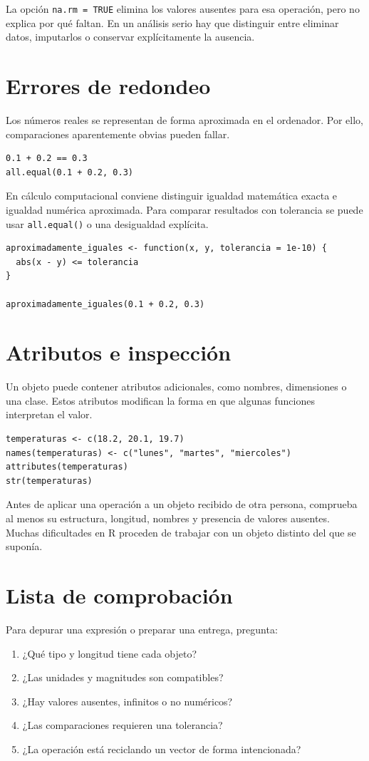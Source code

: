 \documentclass[11pt,a4paper,oneside]{book}
\begin{document}
La opción \texttt{na.rm = TRUE} elimina los valores ausentes para esa operación, pero no explica por qué faltan. En un análisis serio hay que distinguir entre eliminar datos, imputarlos o conservar explícitamente la ausencia.

\section{Errores de redondeo}
Los números reales se representan de forma aproximada en el ordenador. Por ello, comparaciones aparentemente obvias pueden fallar.

\begin{lstlisting}[style=rstyle]
0.1 + 0.2 == 0.3
all.equal(0.1 + 0.2, 0.3)
\end{lstlisting}

En cálculo computacional conviene distinguir igualdad matemática exacta e igualdad numérica aproximada. Para comparar resultados con tolerancia se puede usar \texttt{all.equal()} o una desigualdad explícita.

\begin{lstlisting}[style=rstyle]
aproximadamente_iguales <- function(x, y, tolerancia = 1e-10) {
  abs(x - y) <= tolerancia
}

aproximadamente_iguales(0.1 + 0.2, 0.3)
\end{lstlisting}

\section{Atributos e inspección}
Un objeto puede contener atributos adicionales, como nombres, dimensiones o una clase. Estos atributos modifican la forma en que algunas funciones interpretan el valor.

\begin{lstlisting}[style=rstyle]
temperaturas <- c(18.2, 20.1, 19.7)
names(temperaturas) <- c("lunes", "martes", "miercoles")
attributes(temperaturas)
str(temperaturas)
\end{lstlisting}

Antes de aplicar una operación a un objeto recibido de otra persona, comprueba al menos su estructura, longitud, nombres y presencia de valores ausentes. Muchas dificultades en R proceden de trabajar con un objeto distinto del que se suponía.

\section{Lista de comprobación}
Para depurar una expresión o preparar una entrega, pregunta:
\begin{enumerate}
  \item ¿Qué tipo y longitud tiene cada objeto?
  \item ¿Las unidades y magnitudes son compatibles?
  \item ¿Hay valores ausentes, infinitos o no numéricos?
  \item ¿Las comparaciones requieren una tolerancia?
  \item ¿La operación está reciclando un vector de forma intencionada?
\end{enumerate}
\end{document}
